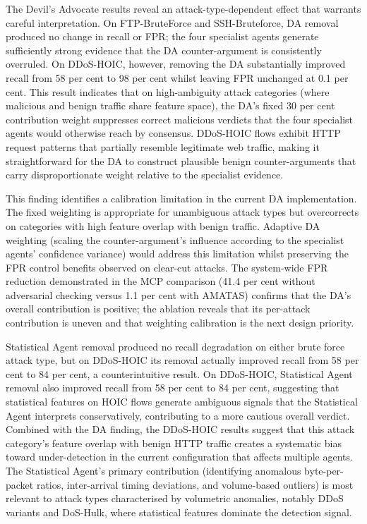\documentclass[../main.tex]{subfiles}
\begin{document}
The Devil's Advocate results reveal an attack-type-dependent effect that warrants careful interpretation. On FTP-BruteForce and SSH-Bruteforce, DA removal produced no change in recall or FPR; the four specialist agents generate sufficiently strong evidence that the DA counter-argument is consistently overruled. On DDoS-HOIC, however, removing the DA substantially improved recall from 58 per cent to 98 per cent whilst leaving FPR unchanged at 0.1 per cent. This result indicates that on high-ambiguity attack categories (where malicious and benign traffic share feature space), the DA's fixed 30 per cent contribution weight suppresses correct malicious verdicts that the four specialist agents would otherwise reach by consensus. DDoS-HOIC flows exhibit HTTP request patterns that partially resemble legitimate web traffic, making it straightforward for the DA to construct plausible benign counter-arguments that carry disproportionate weight relative to the specialist evidence.

This finding identifies a calibration limitation in the current DA implementation. The fixed weighting is appropriate for unambiguous attack types but overcorrects on categories with high feature overlap with benign traffic. Adaptive DA weighting (scaling the counter-argument's influence according to the specialist agents' confidence variance) would address this limitation whilst preserving the FPR control benefits observed on clear-cut attacks. The system-wide FPR reduction demonstrated in the MCP comparison (41.4 per cent without adversarial checking versus 1.1 per cent with AMATAS) confirms that the DA's overall contribution is positive; the ablation reveals that its per-attack contribution is uneven and that weighting calibration is the next design priority.

Statistical Agent removal produced no recall degradation on either brute force attack type, but on DDoS-HOIC its removal actually improved recall from 58 per cent to 84 per cent, a counterintuitive result. On DDoS-HOIC, Statistical Agent removal also improved recall from 58 per cent to 84 per cent, suggesting that statistical features on HOIC flows generate ambiguous signals that the Statistical Agent interprets conservatively, contributing to a more cautious overall verdict. Combined with the DA finding, the DDoS-HOIC results suggest that this attack category's feature overlap with benign HTTP traffic creates a systematic bias toward under-detection in the current configuration that affects multiple agents. The Statistical Agent's primary contribution (identifying anomalous byte-per-packet ratios, inter-arrival timing deviations, and volume-based outliers) is most relevant to attack types characterised by volumetric anomalies, notably DDoS variants and DoS-Hulk, where statistical features dominate the detection signal.
\end{document}
